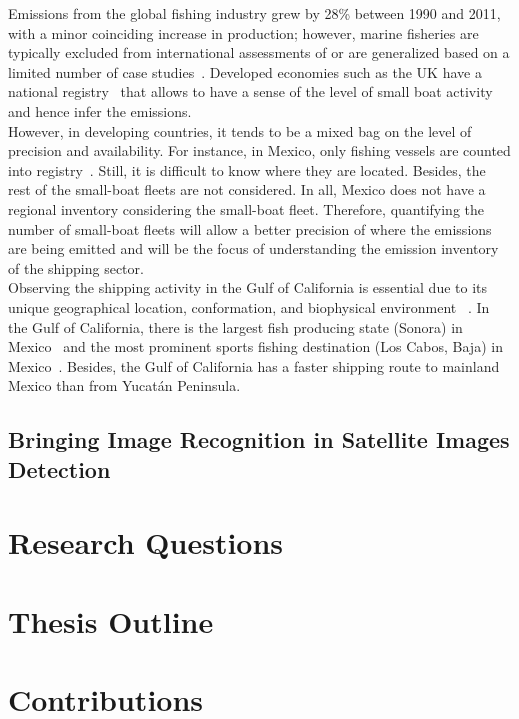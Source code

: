 Emissions from the global fishing industry grew by 28\% between 1990 and 2011, with a minor coinciding increase in production; however, marine fisheries are typically excluded from international assessments of  or are generalized based on a limited number of case studies~\cite{parker2018fuel}. Developed economies such as the UK have a national registry~\cite{uk2021registration} that allows to have a sense of the level of small boat activity and hence infer the  emissions.\\

However, in developing countries, it tends to be a mixed bag on the level of precision and availability. For instance, in Mexico, only fishing vessels are counted into registry~\cite{Mexico2021RegisteredVessels}. Still, it is difficult to know where they are located. Besides, the rest of the small-boat fleets are not considered. In all, Mexico does not have a regional  inventory considering the small-boat fleet. Therefore, quantifying the number of small-boat fleets will allow a better precision of where the emissions are being emitted and will be the focus of understanding the emission inventory of the shipping sector.\\


Observing the shipping activity in the Gulf of California is essential due to its unique geographical location, conformation, and biophysical environment ~\cite{LLUCHCOTA20071, munguia2018ecological, MARINONE2012133}. In the Gulf of California, there is the largest fish producing state (Sonora) in Mexico~\cite{MELTZER2006222} and the most prominent sports fishing destination (Los Cabos, Baja) in Mexico~\cite{hernandez2012economic}. Besides, the Gulf of California has a faster shipping route to mainland Mexico than from Yucatán Peninsula.\\

\subsection{Bringing Image Recognition in Satellite Images Detection}

\section{Research Questions}


\section{Thesis Outline}


\section{Contributions}